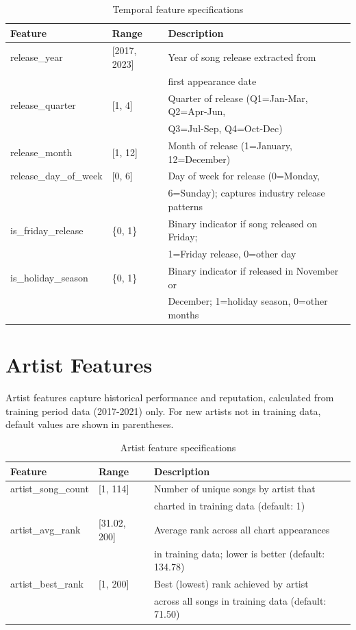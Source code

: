\documentclass{article}
\begin{document}
{{{{{{{\begin{table}[htbp]
\centering
\caption{Temporal feature specifications}
\label{tab:temporal_features}
\begin{tabular}{lll}
\toprule
\textbf{Feature} & \textbf{Range} & \textbf{Description} \\
\midrule
release\_year & [2017, 2023] & Year of song release extracted from \\
& & first appearance date \\
\addlinespace
release\_quarter & [1, 4] & Quarter of release (Q1=Jan-Mar, Q2=Apr-Jun, \\
& & Q3=Jul-Sep, Q4=Oct-Dec) \\
\addlinespace
release\_month & [1, 12] & Month of release (1=January, 12=December) \\
\addlinespace
release\_day\_of\_week & [0, 6] & Day of week for release (0=Monday, \\
& & 6=Sunday); captures industry release patterns \\
\addlinespace
is\_friday\_release & \{0, 1\} & Binary indicator if song released on Friday; \\
& & 1=Friday release, 0=other day \\
\addlinespace
is\_holiday\_season & \{0, 1\} & Binary indicator if released in November or \\
& & December; 1=holiday season, 0=other months \\
\bottomrule
\end{tabular}
\end{table}


\section{Artist Features}

Artist features capture historical performance and reputation, calculated from training period data (2017-2021) only. For new artists not in training data, default values are shown in parentheses.

\begin{table}[htbp]
\centering
\caption{Artist feature specifications}
\label{tab:artist_features}
\begin{tabular}{lll}
\toprule
\textbf{Feature} & \textbf{Range} & \textbf{Description} \\
\midrule
artist\_song\_count & [1, 114] & Number of unique songs by artist that \\
& & charted in training data (default: 1) \\
\addlinespace
artist\_avg\_rank & [31.02, 200] & Average rank across all chart appearances \\
& & in training data; lower is better (default: 134.78) \\
\addlinespace
artist\_best\_rank & [1, 200] & Best (lowest) rank achieved by artist \\
& & across all songs in training data (default: 71.50) \\
\bottomrule
\end{tabular}
\end{table}

}}}}}}}
\end{document}
